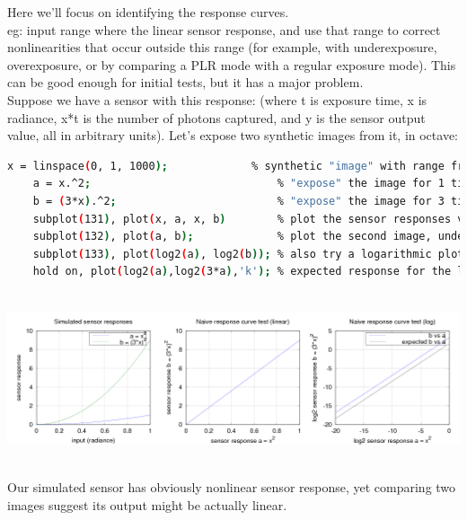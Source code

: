 Here we'll focus on identifying the response curves.\\

eg: input range where the linear sensor response, and use that range to correct nonlinearities that occur outside this range (for example, with underexposure, overexposure, or by comparing a PLR mode with a regular exposure mode). This can be good enough for initial tests, but it has a major problem. \\

Suppose we have a sensor with this response: (where t is exposure time, x is radiance, x*t is the number of photons captured, and y is the sensor output value, all in arbitrary units). Let's expose two synthetic images from it, in octave: 

\begin{lstlisting}[language=bash,morekeywords=$,keywordstyle=\bfseries,frame=none,xleftmargin=.25in,belowskip=2em, aboveskip=2em]
    x = linspace(0, 1, 1000);             % synthetic "image" with range from 0 to 1 (black to white)
    a = x.^2;                             % "expose" the image for 1 time unit
    b = (3*x).^2;                         % "expose" the image for 3 time units
    subplot(131), plot(x, a, x, b)        % plot the sensor responses vs input signal (radiance)
    subplot(132), plot(a, b);             % plot the second image, under the assumption that first one might be linear
    subplot(133), plot(log2(a), log2(b)); % also try a logarithmic plot
    hold on, plot(log2(a),log2(3*a),'k'); % expected response for the logarithmic plot
\end{lstlisting}

\begin{center}
\includegraphics[height=5cm]{images/naive}
\end{center}

Our simulated sensor has obviously nonlinear sensor response, yet comparing two images suggest its output might be actually linear.\\

